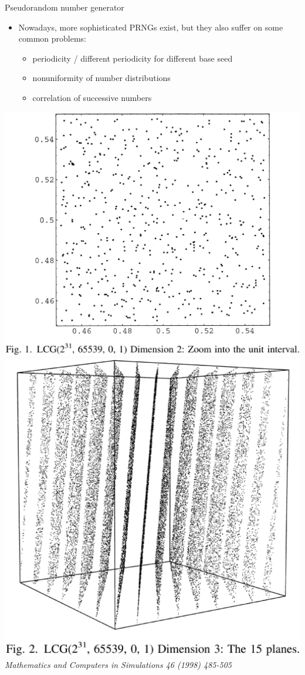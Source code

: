 \begin{slide}[toc=]{Pseudorandom number generator}
\null\vfill

  \begin{itemize}
    \item Nowadays, more sophisticated PRNGs exist, but they also suffer on some common problems:
    \begin{itemize}
      \item periodicity / different periodicity for different base seed
      \item nonuniformity of number distributions
      \item correlation of successive numbers
    \end{itemize}
  \end{itemize}

  \twocolumn
  {
    \includegraphics[width=\columnwidth]{figures/random2d.eps}
  }
  {
    \includegraphics[width=\columnwidth]{figures/random3d.eps}
  }
  {\it\color{pdcolor3}Mathematics and Computers in Simulations 46 (1998) 485-505}
\vfill\null
\end{slide}
